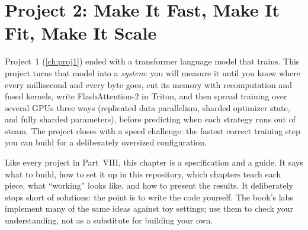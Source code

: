\chapter{Project 2: Make It Fast, Make It Fit, Make It Scale}\label{ch:proj2}

Project~1 (\cref{ch:proj1}) ended with a transformer language model that trains. This project
turns that model into a \emph{system}: you will measure it until you know where every millisecond
and every byte goes, cut its memory with recomputation and fused kernels, write FlashAttention-2 in
Triton, and then spread training over several GPUs three ways (replicated data parallelism, sharded
optimizer state, and fully sharded parameters), before predicting when each strategy runs out of
steam. The project closes with a speed challenge: the fastest correct training step you can build
for a deliberately oversized configuration.

Like every project in Part~VIII, this chapter is a specification and a guide. It says what to build,
how to set it up in this repository, which chapters teach each piece, what ``working'' looks like,
and how to present the results. It deliberately stops short of solutions: the point is to write the
code yourself. The book's labs implement many of the same ideas against toy settings; use them to
check your understanding, not as a substitute for building your own.

